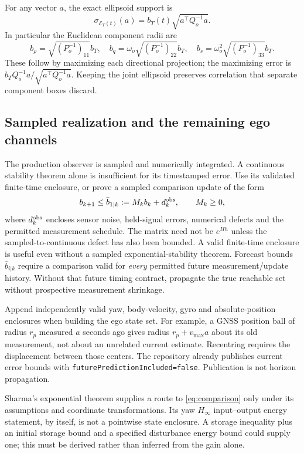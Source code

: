 \documentclass[10pt,letterpaper]{article}
\newcommand{\E}{\mathcal E}
\newcommand{\supp}[2]{\sigma_{#1}(#2)}
\begin{document}
For any vector $a$, the exact ellipsoid support is
\begin{equation}\label{eq:support}
\supp{\E_T(t)}{a}=b_T(t)\sqrt{a^\top Q_o^{-1}a}.
\end{equation}
In particular the Euclidean component radii are
\begin{equation}\label{eq:components}
b_\rho=\sqrt{(P_o^{-1})_{11}}b_T,\quad
b_q=\omega_o\sqrt{(P_o^{-1})_{22}}b_T,\quad
b_s=\omega_o^2\sqrt{(P_o^{-1})_{33}}b_T.
\end{equation}
These follow by maximizing each directional projection; the maximizing error
is $b_TQ_o^{-1}a/\sqrt{a^\top Q_o^{-1}a}$. Keeping the joint ellipsoid preserves
correlation that separate component boxes discard.

\subsection{Sampled realization and the remaining ego channels}
The production observer is sampled and numerically integrated. A continuous
stability theorem alone is insufficient for its timestamped error. Use its
validated finite-time enclosure, or prove a sampled comparison update of the form
\begin{equation}\label{eq:sampled}
b_{k+1}\le \bar b_{1|k}:=M_kb_k+d_k^{\rm obs},\qquad M_k\ge0,
\end{equation}
where $d_k^{\rm obs}$ encloses sensor noise, held-signal errors, numerical defects
and the permitted measurement schedule. The matrix need not be $e^{Hh}$ unless
the sampled-to-continuous defect has also been bounded. A valid finite-time
enclosure is useful even without a sampled exponential-stability theorem.
Forecast bounds $\bar b_{i|k}$ require a comparison valid for \emph{every}
permitted future measurement/update history. Without that future timing
contract, propagate the true reachable set without prospective measurement
shrinkage.

Append independently valid yaw, body-velocity, gyro and absolute-position
enclosures when building the ego state set. For example, a GNSS position ball
of radius $r_p$ measured $a$ seconds ago gives radius $r_p+v_{\max}a$ about its
old measurement, not about an unrelated current estimate. Recentring requires
the displacement between those centers. The repository already publishes
current error bounds with \texttt{futurePredictionIncluded=false}. Publication
is not horizon propagation.

Sharma's exponential theorem supplies a route to \eqref{eq:comparison} only
under its assumptions and coordinate transformations. Its yaw $H_\infty$
input--output energy statement, by itself, is not a pointwise state enclosure.
A storage inequality plus an initial storage bound and a specified disturbance
energy bound could supply one; this must be derived rather than inferred from
the gain alone.
\end{document}
